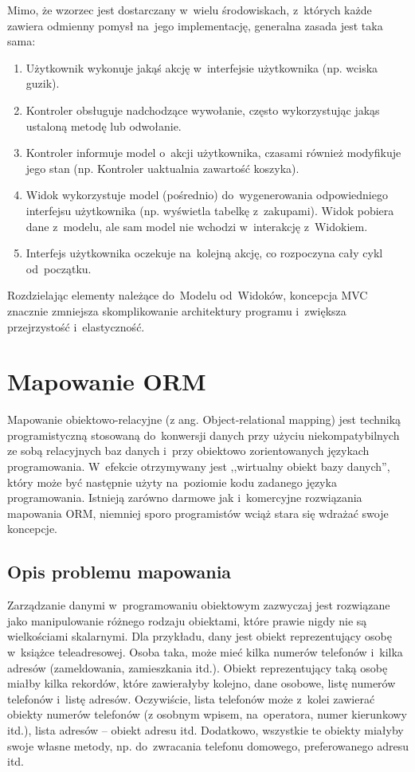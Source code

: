 \documentclass[a4paper,12pt,oneside]{report}
\begin{document}
Mimo, że wzorzec jest dostarczany w~wielu środowiskach, z~których każde zawiera odmienny pomysł na~jego implementację, generalna zasada jest taka sama:
\begin{enumerate}
  \item Użytkownik wykonuje jakąś akcję w~interfejsie użytkownika (np. wciska guzik).
  \item Kontroler obsługuje nadchodzące wywołanie, często wykorzystując jakąs ustaloną metodę lub odwołanie.
  \item Kontroler informuje model o~akcji użytkownika, czasami również modyfikuje jego stan (np. Kontroler uaktualnia zawartość koszyka).
  \item Widok wykorzystuje model (pośrednio) do~wygenerowania odpowiedniego interfejsu użytkownika (np. wyświetla tabelkę z~zakupami). Widok pobiera dane z~modelu, ale sam model nie wchodzi w~interakcję z~Widokiem.
  \item Interfejs użytkownika oczekuje na~kolejną akcję, co rozpoczyna cały cykl od~początku.
\end{enumerate}

Rozdzielając elementy należące do~Modelu od~Widoków, koncepcja MVC znacznie zmniejsza skomplikowanie architektury programu i~zwiększa przejrzystość i~elastyczność.

\section{Mapowanie ORM}
\label{sec:orm}
Mapowanie obiektowo-relacyjne (z ang. Object-relational mapping) jest techniką programistyczną stosowaną do~konwersji danych przy użyciu niekompatybilnych ze sobą relacyjnych baz danych i~przy obiektowo zorientowanych językach programowania. W~efekcie otrzymywany jest ,,wirtualny obiekt bazy danych'', który może być następnie użyty na~poziomie kodu zadanego języka programowania. Istnieją zarówno darmowe jak i~komercyjne rozwiązania mapowania ORM, niemniej sporo programistów wciąż stara się wdrażać swoje koncepcje.

\subsection{Opis problemu mapowania}
\label{subsec:orm-problem}
Zarządzanie danymi w~programowaniu obiektowym zazwyczaj jest rozwiązane jako manipulowanie różnego rodzaju obiektami, które prawie nigdy nie są wielkościami skalarnymi. Dla przykładu, dany jest obiekt reprezentujący osobę w~książce teleadresowej. Osoba taka, może mieć kilka numerów telefonów i~kilka adresów (zameldowania, zamieszkania itd.). Obiekt reprezentujący taką osobę miałby kilka rekordów, które zawierałyby kolejno, dane osobowe, listę numerów telefonów i~listę adresów. Oczywiście, lista telefonów może z~kolei zawierać obiekty numerów telefonów (z osobnym wpisem, na~operatora, numer kierunkowy itd.), lista adresów -- obiekt adresu itd. Dodatkowo, wszystkie te obiekty miałyby swoje własne metody, np. do~zwracania telefonu domowego, preferowanego adresu itd.
\end{document}
